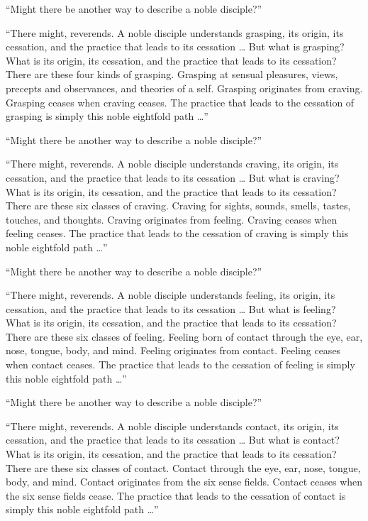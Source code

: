 \documentclass[12pt,openany]{book}%
\begin{document}
“Might there be another way to describe a noble disciple?” 

“There might, reverends. A noble disciple understands grasping, its origin, its cessation, and the practice that leads to its cessation … But what is grasping? What is its origin, its cessation, and the practice that leads to its cessation? There are these four kinds of grasping. Grasping at sensual pleasures, views, precepts and observances, and theories of a self. Grasping originates from craving. Grasping ceases when craving ceases. The practice that leads to the cessation of grasping is simply this noble eightfold path …” 

“Might there be another way to describe a noble disciple?” 

“There might, reverends. A noble disciple understands craving, its origin, its cessation, and the practice that leads to its cessation … But what is craving? What is its origin, its cessation, and the practice that leads to its cessation? There are these six classes of craving. Craving for sights, sounds, smells, tastes, touches, and thoughts. Craving originates from feeling. Craving ceases when feeling ceases. The practice that leads to the cessation of craving is simply this noble eightfold path …” 

“Might there be another way to describe a noble disciple?” 

“There might, reverends. A noble disciple understands feeling, its origin, its cessation, and the practice that leads to its cessation … But what is feeling? What is its origin, its cessation, and the practice that leads to its cessation? There are these six classes of feeling. Feeling born of contact through the eye, ear, nose, tongue, body, and mind. Feeling originates from contact. Feeling ceases when contact ceases. The practice that leads to the cessation of feeling is simply this noble eightfold path …” 

“Might there be another way to describe a noble disciple?” 

“There might, reverends. A noble disciple understands contact, its origin, its cessation, and the practice that leads to its cessation … But what is contact? What is its origin, its cessation, and the practice that leads to its cessation? There are these six classes of contact. Contact through the eye, ear, nose, tongue, body, and mind. Contact originates from the six sense fields. Contact ceases when the six sense fields cease. The practice that leads to the cessation of contact is simply this noble eightfold path …” 
\end{document}
